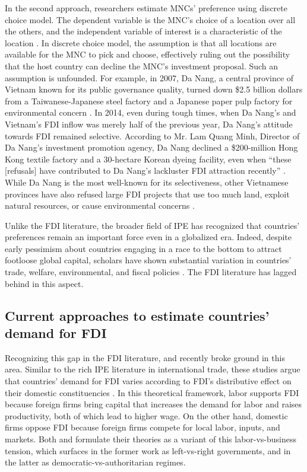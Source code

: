 In the second approach, researchers estimate MNCs' preference using discrete
choice model. The dependent variable is the MNC's choice of a location over all
the others, and the independent variable of interest is a characteristic of the
location \citep{Arauzo-Carod2010}. In discrete choice model, the assumption is
that all locations are available for the MNC to pick and choose, effectively
ruling out the possibility that the host country can decline the MNC's
investment proposal. Such an assumption is unfounded. For example, in 2007, Da
Nang, a central province of Vietnam known for its public governance quality,
turned down \$2.5 billion dollars from a Taiwanese-Japanese steel factory and a
Japanese paper pulp factory for environmental concern \citep{HDung2007}. In
2014, even during tough times, when Da Nang's and Vietnam's FDI inflow was
merely half of the previous year, Da Nang's attitude towards FDI remained
selective. According to Mr. Lam Quang Minh, Director of Da Nang's investment
promotion agency, Da Nang declined a \$200-million Hong Kong textile factory and
a 30-hectare Korean dyeing facility, even when ``these [refusals] have
contributed to Da Nang's lackluster FDI attraction recently''
\citep{HaiChau2015}. While Da Nang is the most well-known for its selectiveness,
other Vietnamese provinces have also refused large FDI projects that use too
much land, exploit natural resources, or cause environmental concerns
\citep{QuocHung2015}.

Unlike the FDI literature, the broader field of IPE has recognized that
countries' preferences remain an important force even in a globalized era.
Indeed, despite early pessimism about countries engaging in a race to the bottom
to attract footloose global capital, scholars have shown substantial variation
in countries' trade, welfare, environmental, and fiscal policies
\citep{Drezner2001}. The FDI literature has lagged behind in this aspect.

\subsection{Current approaches to estimate countries' demand for FDI}

Recognizing this gap in the FDI literature, \citet{Pinto2013} and \citet{Pandya2016}
recently broke ground in this area. Similar to the rich IPE literature in
international trade, these studies argue that countries' demand for FDI varies
according to FDI's distributive effect on their domestic constituencies
\citep{Broz2001, Milner2005a}. In this theoretical framework, labor supports FDI
because foreign firms bring capital that increases the demand for labor and
raises productivity, both of which lead to higher wage. On the other hand,
domestic firms oppose FDI because foreign firms compete for local labor, inputs,
and markets. Both \citet{Pinto2013} and \citet{Pandya2016} formulate their
theories as a variant of this labor-vs-business tension, which surfaces in the
former work as left-vs-right governments, and in the latter as
democratic-vs-authoritarian regimes.

